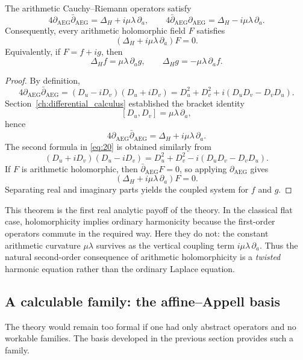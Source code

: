 \begin{theorem}\label{thm:factorization_twisted_harmonicity}
The arithmetic Cauchy--Riemann operators satisfy
\begin{equation}\label{eq:20}\tag{20}
4\partial_{\mathrm{AEG}}\bar\partial_{\mathrm{AEG}}
=
\Delta_H+i\mu\lambda\,\partial_a,
\qquad
4\bar\partial_{\mathrm{AEG}}\partial_{\mathrm{AEG}}
=
\Delta_H-i\mu\lambda\,\partial_a.
\end{equation}
Consequently, every arithmetic holomorphic field $F$ satisfies
\[
(\Delta_H+i\mu\lambda\,\partial_a)F=0.
\]
Equivalently, if $F=f+ig$, then
\[
\Delta_H f=\mu\lambda\,\partial_a g,
\qquad
\Delta_H g=-\mu\lambda\,\partial_a f.
\]
\end{theorem}

\begin{proof}
By definition,
\[
4\partial_{\mathrm{AEG}}\bar\partial_{\mathrm{AEG}}
=
(D_u-iD_v)(D_u+iD_v)
=
D_u^2+D_v^2+i(D_uD_v-D_vD_u).
\]
Section~\ref{ch:differential_calculus} established the bracket identity
\[
[D_u,D_v]=\mu\lambda\,\partial_a,
\]
hence
\[
4\partial_{\mathrm{AEG}}\bar\partial_{\mathrm{AEG}}
=
\Delta_H+i\mu\lambda\,\partial_a.
\]
The second formula in \eqref{eq:20} is obtained similarly from
\[
(D_u+iD_v)(D_u-iD_v)
=
D_u^2+D_v^2-i(D_uD_v-D_vD_u).
\]
If $F$ is arithmetic holomorphic, then $\bar\partial_{\mathrm{AEG}}F=0$, so applying $\partial_{\mathrm{AEG}}$ gives
\[
(\Delta_H+i\mu\lambda\,\partial_a)F=0.
\]
Separating real and imaginary parts yields the coupled system for $f$ and $g$.
\end{proof}

This theorem is the first real analytic payoff of the theory. In the classical flat case, holomorphicity implies ordinary harmonicity because the first-order operators commute in the required way. Here they do not: the constant arithmetic curvature $\mu\lambda$ survives as the vertical coupling term $i\mu\lambda\,\partial_a$. Thus the natural second-order consequence of arithmetic holomorphicity is a \emph{twisted} harmonic equation rather than the ordinary Laplace equation.

\subsection{A calculable family: the affine--Appell basis}

The theory would remain too formal if one had only abstract operators and no workable families. The basis developed in the previous section provides such a family.

